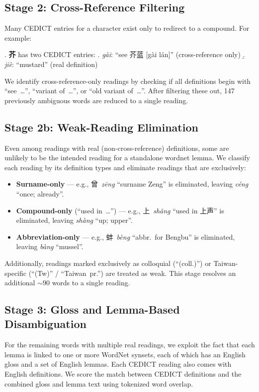 \documentclass[11pt,a4paper]{article}
\begin{document}
\subsection{Stage 2: Cross-Reference Filtering}

Many CEDICT entries for a character exist only to redirect to a
compound.  For example:

\ex. \textbf{芥} has two CEDICT entries:
  \a. \emph{gài}: ``see 芥蓝 [gài lán]'' (cross-reference only)
  \b. \emph{jiè}: ``mustard'' (real definition)

We identify cross-reference-only readings by checking if all
definitions begin with ``see~\ldots'', ``variant of~\ldots'', or
``old variant of~\ldots''.  After filtering these out, 147 previously
ambiguous words are reduced to a single reading.

\subsection{Stage 2b: Weak-Reading Elimination}

Even among readings with real (non-cross-reference) definitions, some
are unlikely to be the intended reading for a standalone wordnet
lemma.  We classify each reading by its definition types and eliminate
readings that are exclusively:

\begin{itemize}[nosep]
\item \textbf{Surname-only} --- e.g., 曾~\emph{zēng} ``surname
  Zeng'' is eliminated, leaving \emph{céng} ``once; already''.
\item \textbf{Compound-only} (``used in~\ldots'') --- e.g.,
  上~\emph{shǎng} ``used in 上声'' is eliminated, leaving
  \emph{shàng} ``up; upper''.
\item \textbf{Abbreviation-only} --- e.g., 蚌~\emph{bèng} ``abbr.\
  for Bengbu'' is eliminated, leaving \emph{bàng} ``mussel''.
\end{itemize}

\noindent Additionally, readings marked exclusively as colloquial (``(coll.)'')
or Taiwan-specific (``(Tw)'' / ``Taiwan~pr.'') are treated as weak.
This stage resolves an additional ${\sim}90$ words to a
single reading.

\subsection{Stage 3: Gloss and Lemma-Based Disambiguation}

For the remaining words with multiple real readings, we exploit
the fact that each lemma is linked to one or more WordNet synsets,
each of which has an English gloss and a set of English lemmas.  Each
CEDICT reading also comes with English definitions.  We score the
match between CEDICT definitions and the combined gloss and lemma text
using tokenized word overlap.
\end{document}
